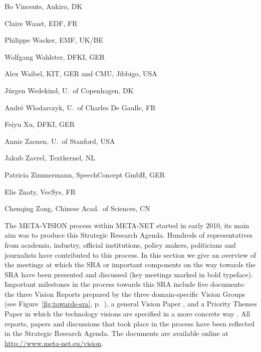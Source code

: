 \documentclass[10pt, plain]{../../metanetpaper}
\begin{document}
\begin{multicols}{3}
\begin{footnotesize}
\begin{enumerate}
{      \item Bo Vincents, Ankiro, DK
      \item Claire Waast, EDF, FR
      \item Philippe Wacker, EMF, UK/BE
      \item Wolfgang Wahlster, DFKI, GER
      \item Alex Waibel, KIT, GER and CMU, Jibbigo, USA
      \item Jürgen Wedekind, U.~of Copenhagen, DK
      \item André Wlodarczyk, U.~of Charles De Gaulle, FR
      \item Feiyu Xu, DFKI, GER
      \item Annie Zaenen, U.~of Stanford, USA
      \item Jakub Zavrel, Textkernel, NL
      \item Patricia Zimmermann, SpeechConcept GmbH, GER
      \item Elie Znaty, VecSys, FR
      \item Chenqing Zong, Chinese Acad.~of Sciences, CN
    }
  \end{enumerate}
\end{footnotesize}
\end{multicols}
  
\clearpage


\label{vision-evolution}

\begin{small}
The META-VISION process within META-NET started in early 2010, its main aim was to produce this Strategic Research Agenda. Hundreds of representatives from academia, industry, official institutions, policy makers, politicians and journalists have contributed to this process. In this section we give an overview of the meetings at which the SRA or important components on the way towards the SRA have been presented and discussed (key meetings marked in bold typeface). 
%
Important milestones in the process towards this SRA include five documents: the three Vision Reports prepared by the three domain-specific Vision Groups (see Figure~\ref{fig:towards-sra}, p.~\pageref{fig:towards-sra}), a general Vision Paper \cite{Meta1}, and a Priority Themes Paper in which the technology visions are specified in a more concrete way \cite{LT2020}. All reports, papers and discussions that took place in the process have been reflected in the Strategic Research Agenda. The documents are available online at \url{http://www.meta-net.eu/vision}.
\end{small}
\end{document}
